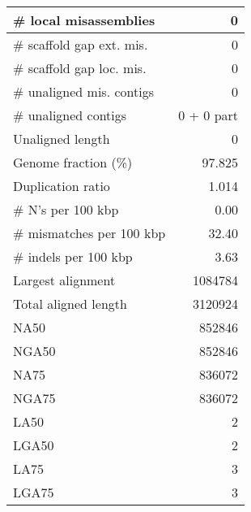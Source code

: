 \documentclass[12pt,a4paper]{article}
\begin{document}
\begin{table}[ht]
\begin{center}
\begin{tabular}{|l*{1}{|r}|}
\# local misassemblies & 0 \\ \hline
\# scaffold gap ext. mis. & 0 \\ \hline
\# scaffold gap loc. mis. & 0 \\ \hline
\# unaligned mis. contigs & 0 \\ \hline
\# unaligned contigs & 0 + 0 part \\ \hline
Unaligned length & 0 \\ \hline
Genome fraction (\%) & 97.825 \\ \hline
Duplication ratio & 1.014 \\ \hline
\# N's per 100 kbp & 0.00 \\ \hline
\# mismatches per 100 kbp & 32.40 \\ \hline
\# indels per 100 kbp & 3.63 \\ \hline
Largest alignment & 1084784 \\ \hline
Total aligned length & 3120924 \\ \hline
NA50 & 852846 \\ \hline
NGA50 & 852846 \\ \hline
NA75 & 836072 \\ \hline
NGA75 & 836072 \\ \hline
LA50 & 2 \\ \hline
LGA50 & 2 \\ \hline
LA75 & 3 \\ \hline
LGA75 & 3 \\ \hline
\end{tabular}
\end{center}
\end{table}
\end{document}
